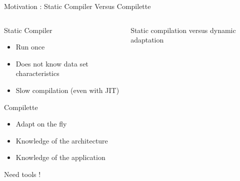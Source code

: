 %
\begin{Frame}{Motivation : Static Compiler Versus Compilette}
  \begin{columns}[t]
    \begin{column}{\BW} %
      \begin{block}{Static Compiler}
        \begin{itemize}
        \item Run once
        \item Does not know data set characteristics
        \item Slow compilation (even with JIT)
        \end{itemize}
      \end{block}
      \begin{alertblock}{Compilette}
        \begin{itemize}
        \item Adapt on the fly
        \item Knowledge of the architecture
        \item Knowledge of the application
        \end{itemize}
        Need tools !
      \end{alertblock}
    \end{column}

    \begin{column}{\BW} %
      \begin{block}{Static compilation versus dynamic adaptation}
      \end{block}
    \end{column}
  \end{columns}
\end{Frame}

